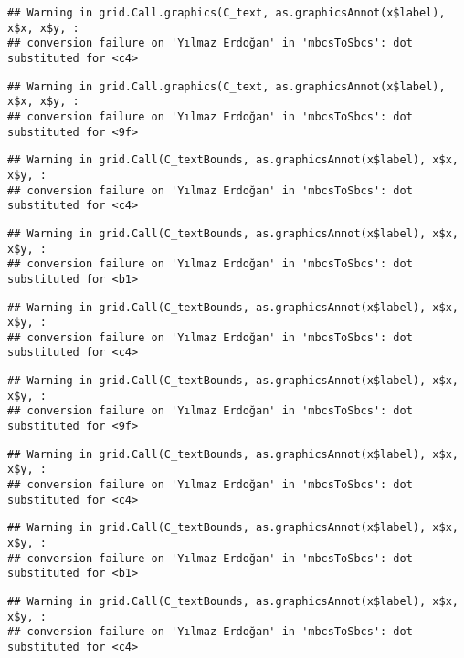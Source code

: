 \documentclass[
]{article}
\begin{document}
\begin{verbatim}
## Warning in grid.Call.graphics(C_text, as.graphicsAnnot(x$label), x$x, x$y, :
## conversion failure on 'Yılmaz Erdoğan' in 'mbcsToSbcs': dot substituted for <c4>
\end{verbatim}

\begin{verbatim}
## Warning in grid.Call.graphics(C_text, as.graphicsAnnot(x$label), x$x, x$y, :
## conversion failure on 'Yılmaz Erdoğan' in 'mbcsToSbcs': dot substituted for <9f>
\end{verbatim}

\begin{verbatim}
## Warning in grid.Call(C_textBounds, as.graphicsAnnot(x$label), x$x, x$y, :
## conversion failure on 'Yılmaz Erdoğan' in 'mbcsToSbcs': dot substituted for <c4>
\end{verbatim}

\begin{verbatim}
## Warning in grid.Call(C_textBounds, as.graphicsAnnot(x$label), x$x, x$y, :
## conversion failure on 'Yılmaz Erdoğan' in 'mbcsToSbcs': dot substituted for <b1>
\end{verbatim}

\begin{verbatim}
## Warning in grid.Call(C_textBounds, as.graphicsAnnot(x$label), x$x, x$y, :
## conversion failure on 'Yılmaz Erdoğan' in 'mbcsToSbcs': dot substituted for <c4>
\end{verbatim}

\begin{verbatim}
## Warning in grid.Call(C_textBounds, as.graphicsAnnot(x$label), x$x, x$y, :
## conversion failure on 'Yılmaz Erdoğan' in 'mbcsToSbcs': dot substituted for <9f>
\end{verbatim}

\begin{verbatim}
## Warning in grid.Call(C_textBounds, as.graphicsAnnot(x$label), x$x, x$y, :
## conversion failure on 'Yılmaz Erdoğan' in 'mbcsToSbcs': dot substituted for <c4>
\end{verbatim}

\begin{verbatim}
## Warning in grid.Call(C_textBounds, as.graphicsAnnot(x$label), x$x, x$y, :
## conversion failure on 'Yılmaz Erdoğan' in 'mbcsToSbcs': dot substituted for <b1>
\end{verbatim}

\begin{verbatim}
## Warning in grid.Call(C_textBounds, as.graphicsAnnot(x$label), x$x, x$y, :
## conversion failure on 'Yılmaz Erdoğan' in 'mbcsToSbcs': dot substituted for <c4>
\end{verbatim}
\end{document}
